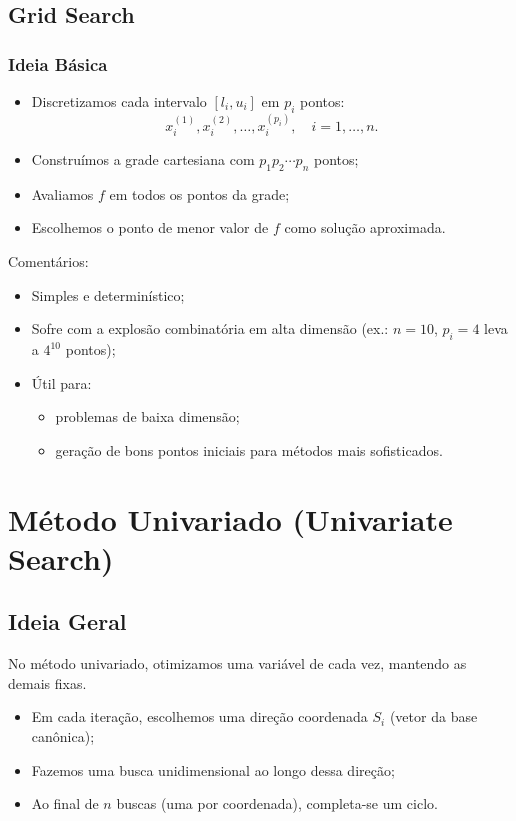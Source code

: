 \documentclass[9pt,a4paper]{extarticle}
\begin{document}
\subsection{Grid Search}

\subsubsection*{Ideia Básica}

\begin{itemize}
    \item Discretizamos cada intervalo $[l_i,u_i]$ em $p_i$ pontos:
    \[
        x_i^{(1)}, x_i^{(2)}, \dots, x_i^{(p_i)},\quad i=1,\dots,n.
    \]
    \item Construímos a grade cartesiana com $p_1 p_2 \cdots p_n$ pontos;
    \item Avaliamos $f$ em todos os pontos da grade;
    \item Escolhemos o ponto de menor valor de $f$ como solução aproximada.
\end{itemize}

Comentários:
\begin{itemize}
    \item Simples e determinístico;
    \item Sofre com a explosão combinatória em alta dimensão (ex.: $n=10$, $p_i=4$ leva a $4^{10}$ pontos);
    \item Útil para:
    \begin{itemize}
        \item problemas de baixa dimensão;
        \item geração de bons pontos iniciais para métodos mais sofisticados.
    \end{itemize}
\end{itemize}

\section{Método Univariado (Univariate Search)}

\subsection{Ideia Geral}

No método univariado, otimizamos uma variável de cada vez, mantendo as demais fixas.

\begin{itemize}
    \item Em cada iteração, escolhemos uma direção coordenada $S_i$ (vetor da base canônica);
    \item Fazemos uma busca unidimensional ao longo dessa direção;
    \item Ao final de $n$ buscas (uma por coordenada), completa-se um ciclo.
\end{itemize}
\end{document}
